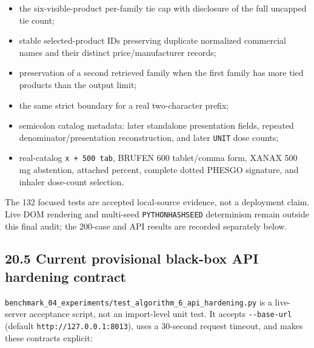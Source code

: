 \begin{itemize}
\item
  the six-visible-product per-family tie cap with disclosure of the full uncapped tie count;
\item
  stable selected-product IDs preserving duplicate normalized commercial names and their distinct price/manufacturer records;
\item
  preservation of a second retrieved family when the first family has more tied products than the output limit;
\item
  the same strict boundary for a real two-character prefix;
\item
  semicolon catalog metadata: later standalone presentation fields, repeated denominator/presentation reconstruction, and later \texttt{UNIT} dose counts;
\item
  real-catalog \texttt{x\ +\ 500\ tab}, BRUFEN 600 tablet/comma form, XANAX 500 mg abstention, attached percent, complete dotted PHESGO signature, and inhaler dose-count selection.
\end{itemize}

The 132 focused tests are accepted local-source evidence, not a deployment claim. Live DOM rendering and multi-seed \texttt{PYTHONHASHSEED} determinism remain outside this final audit; the 200-case and API results are recorded separately below.

\subsection{20.5 Current provisional black-box API hardening contract}\label{205-current-provisional-black-box-api-hardening-contract}

\texttt{benchmark\_\allowbreak{}04\_\allowbreak{}experiments/test\_\allowbreak{}algorithm\_\allowbreak{}6\_\allowbreak{}api\_\allowbreak{}hardening.py} is a live-server acceptance script, not an import-level unit test. It accepts \texttt{-\/-base-url} (default \texttt{http://127.0.0.1:8013}), uses a 30-second request timeout, and makes these contracts explicit:

